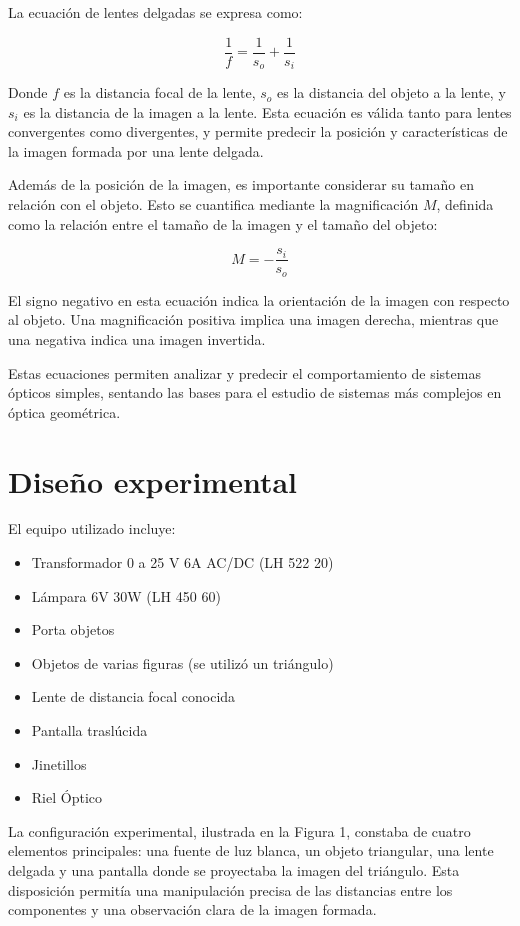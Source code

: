 \documentclass[twocolumn,a4paper,11pt]{scrartcl}
\begin{document}
La ecuación de lentes delgadas se expresa como:

\begin{equation}
\frac{1}{f} = \frac{1}{s_o} + \frac{1}{s_i}
\end{equation}

Donde $f$ es la distancia focal de la lente, $s_o$ es la distancia del objeto a la lente, y $s_i$ es la distancia de la imagen a la lente. Esta ecuación es válida tanto para lentes convergentes como divergentes, y permite predecir la posición y características de la imagen formada por una lente delgada.

Además de la posición de la imagen, es importante considerar su tamaño en relación con el objeto. Esto se cuantifica mediante la magnificación $M$, definida como la relación entre el tamaño de la imagen y el tamaño del objeto:

\begin{equation}
M = -\frac{s_i}{s_o}
\end{equation}

El signo negativo en esta ecuación indica la orientación de la imagen con respecto al objeto. Una magnificación positiva implica una imagen derecha, mientras que una negativa indica una imagen invertida.

Estas ecuaciones permiten analizar y predecir el comportamiento de sistemas ópticos simples, sentando las bases para el estudio de sistemas más complejos en óptica geométrica.

\section{Diseño experimental}
El equipo utilizado incluye:

\begin{itemize}
    \item Transformador 0 a 25 V 6A AC/DC (LH 522 20)
    \item Lámpara 6V 30W (LH 450 60)
    \item Porta objetos
    \item Objetos de varias figuras (se utilizó un triángulo)
    \item Lente de distancia focal conocida
    \item Pantalla traslúcida
    \item Jinetillos
    \item Riel Óptico
\end{itemize}

La configuración experimental, ilustrada en la Figura 1, constaba de cuatro elementos principales: una fuente de luz blanca, un objeto triangular, una lente delgada y una pantalla donde se proyectaba la imagen del triángulo. Esta disposición permitía una manipulación precisa de las distancias entre los componentes y una observación clara de la imagen formada.
\end{document}
